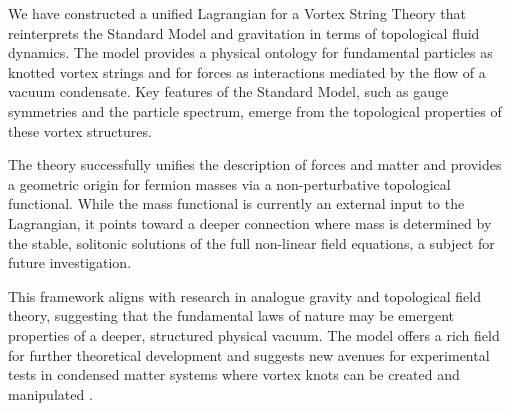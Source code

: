 \documentclass[12pt, a4paper]{article}
\begin{document}
    We have constructed a unified Lagrangian for a Vortex String Theory that reinterprets the Standard Model and gravitation in terms of topological fluid dynamics. The model provides a physical ontology for fundamental particles as knotted vortex strings and for forces as interactions mediated by the flow of a vacuum condensate. Key features of the Standard Model, such as gauge symmetries and the particle spectrum, emerge from the topological properties of these vortex structures.

    The theory successfully unifies the description of forces and matter and provides a geometric origin for fermion masses via a non-perturbative topological functional. While the mass functional is currently an external input to the Lagrangian, it points toward a deeper connection where mass is determined by the stable, solitonic solutions of the full non-linear field equations, a subject for future investigation.

    This framework aligns with research in analogue gravity \cite{Barcelo2011} and topological field theory, suggesting that the fundamental laws of nature may be emergent properties of a deeper, structured physical vacuum. The model offers a rich field for further theoretical development and suggests new avenues for experimental tests in condensed matter systems where vortex knots can be created and manipulated \cite{Kleckner2013}.

    \newpage
    \printbibliography[title={References}]
\end{document}
